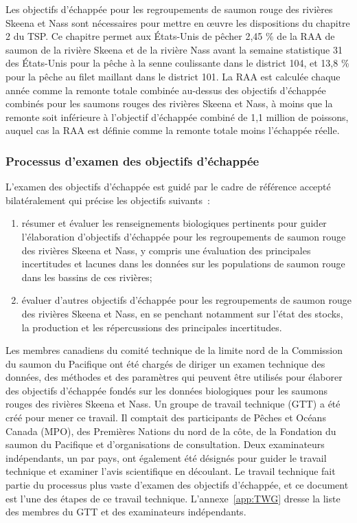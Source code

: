 \documentclass[french,11pt]{book}
\begin{document}
Les objectifs d'échappée pour les regroupements de saumon rouge des rivières Skeena et Nass sont nécessaires pour mettre en œuvre les dispositions du chapitre 2 du TSP. Ce chapitre permet aux États-Unis de pêcher 2,45 \% de la RAA de saumon de la rivière Skeena et de la rivière Nass avant la semaine statistique 31 des États-Unis pour la pêche à la senne coulissante dans le district 104, et 13,8 \% pour la pêche au filet maillant dans le district 101. La RAA est calculée chaque année comme la remonte totale combinée au-dessus des objectifs d'échappée combinés pour les saumons rouges des rivières Skeena et Nass, à moins que la remonte soit inférieure à l'objectif d'échappée combiné de 1,1 million de poissons, auquel cas la RAA est définie comme la remonte totale moins l'échappée réelle.

\subsubsection{Processus d'examen des objectifs d'échappée}\label{EGProcess}

L'examen des objectifs d'échappée est guidé par le cadre de référence accepté bilatéralement qui précise les objectifs suivants~:
\begin{enumerate}
\def\labelenumi{\arabic{enumi}.}

\item
  résumer et évaluer les renseignements biologiques pertinents pour guider l'élaboration d'objectifs d'échappée pour les regroupements de saumon rouge des rivières Skeena et Nass, y compris une évaluation des principales incertitudes et lacunes dans les données sur les populations de saumon rouge dans les bassins de ces rivières;
\item
  évaluer d'autres objectifs d'échappée pour les regroupements de saumon rouge des rivières Skeena et Nass, en se penchant notamment sur l'état des stocks, la production et les répercussions des principales incertitudes.
\end{enumerate}
Les membres canadiens du comité technique de la limite nord de la Commission du saumon du Pacifique ont été chargés de diriger un examen technique des données, des méthodes et des paramètres qui peuvent être utilisés pour élaborer des objectifs d'échappée fondés sur les données biologiques pour les saumons rouges des rivières Skeena et Nass. Un groupe de travail technique (GTT) a été créé pour mener ce travail. Il comptait des participants de Pêches et Océans Canada (MPO), des Premières Nations du nord de la côte, de la Fondation du saumon du Pacifique et d'organisations de consultation. Deux examinateurs indépendants, un par pays, ont également été désignés pour guider le travail technique et examiner l'avis scientifique en découlant. Le travail technique fait partie du processus plus vaste d'examen des objectifs d'échappée, et ce document est l'une des étapes de ce travail technique. L'annexe~\ref{app:TWG} dresse la liste des membres du GTT et des examinateurs indépendants.
\end{document}
